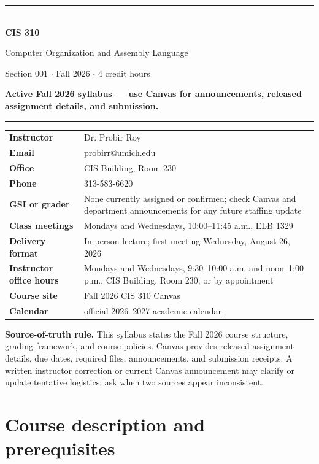 \documentclass[10pt,letterpaper]{article}
\newcommand{\canvas}{\href{https://canvas.umd.umich.edu/courses/552144}{Fall 2026 CIS 310 Canvas}}
\newcommand{\calendarlink}{\href{https://umdearborn.edu/sites/default/files/unmanaged/pdf/registrar/2026-2027-academic-calendar.pdf}{official 2026--2027 academic calendar}}
\begin{document}
\begin{center}
{\color{MichiganBlue}\rule{\textwidth}{2.5pt}}\\[7pt]
{\LARGE\bfseries CIS 310}\par
{\Large Computer Organization and Assembly Language}\par
{\large Section 001 $\cdot$ Fall 2026 $\cdot$ 4 credit hours}\par
\vspace{7pt}
\colorbox{MichiganMaize}{\parbox{0.92\textwidth}{\centering\bfseries Active Fall 2026 syllabus --- use Canvas for announcements, released assignment details, and submission.}}
\vspace{7pt}
{\color{MichiganBlue}\rule{\textwidth}{1.2pt}}
\end{center}

\begin{tabularx}{\textwidth}{>{\bfseries}p{}X}
Instructor & Dr. Probir Roy\\
Email & \href{mailto:probirr@umich.edu}{probirr@umich.edu}\\
Office & CIS Building, Room 230\\
Phone & 313-583-6620\\
GSI or grader & None currently assigned or confirmed; check Canvas and department announcements for any future staffing update\\
Class meetings & Mondays and Wednesdays, 10:00--11:45 a.m., ELB 1329\\
Delivery format & In-person lecture; first meeting Wednesday, August 26, 2026\\
Instructor office hours & Mondays and Wednesdays, 9:30--10:00 a.m. and noon--1:00 p.m., CIS Building, Room 230; or by appointment\\
Course site & \canvas\\
Calendar & \calendarlink\\
\end{tabularx}

\vspace{4pt}
\colorbox{SoftBlue}{\parbox{0.96\textwidth}{\textbf{Source-of-truth rule.} This syllabus states the Fall 2026 course structure, grading framework, and course policies. Canvas provides released assignment details, due dates, required files, announcements, and submission receipts. A written instructor correction or current Canvas announcement may clarify or update tentative logistics; ask when two sources appear inconsistent.}}

\section{Course description and prerequisites}
\end{document}
